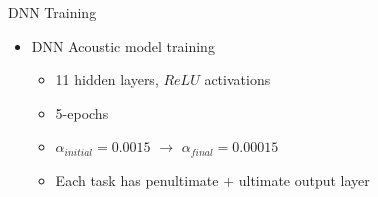 \documentclass[final]{beamer} %
\newlength{\columnheight}
\begin{document}
\begin{frame}
\begin{columns}
\begin{column}{0.22\textwidth}
{        \vspace{.5cm}  

        \begin{block}{\boxnumber DNN Training}          
          \begin{itemize}    
          \item DNN Acoustic model training
            \begin{itemize}
            \item 11 hidden layers, $ReLU$ activations
            \item 5-epochs
            \item $\alpha_{initial}=0.0015$ $\rightarrow$ $\alpha_{final}=0.00015$
            \item Each task has penultimate + ultimate output layer
            \end{itemize}
          \end{itemize}
        \end{block}
        \vspace{.5cm}
       
      } %
    \end{column}
    
    \begin{column}{0.22\textwidth}
      \parbox[t][\columnheight]{.9\textwidth}{

        \vspace{.5cm}               %

}
\end{column}
\end{columns}
\end{frame}
\end{document}
